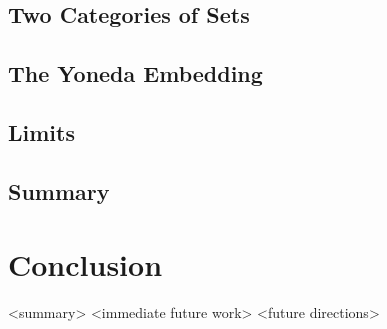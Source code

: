 \documentclass[twoside,titlepage,11pt]{article}
\begin{document}
\subsection{Two Categories of Sets}%
\subsection{The Yoneda Embedding}%
\subsection{Limits}%
\subsection{Summary}%
\section{Conclusion}%
<summary>%
<immediate future work>%
<future directions>%


\end{document}
